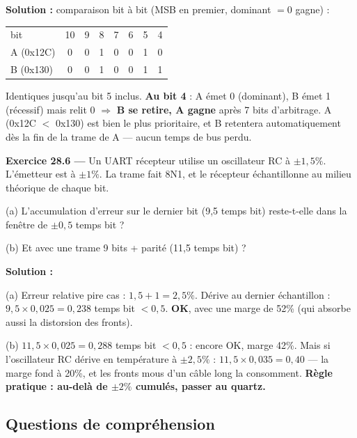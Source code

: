 \documentclass[12pt,a4paper,twoside]{book}
\begin{document}
\begin{pratique}
\textbf{Solution :} comparaison bit à bit (MSB en premier, dominant $= 0$ gagne) :

\begin{center}
\begin{tabular}{lccccccc}
bit & 10 & 9 & 8 & 7 & 6 & 5 & 4 \\
A (0x12C) & 0 & 0 & 1 & 0 & 0 & 1 & 0 \\
B (0x130) & 0 & 0 & 1 & 0 & 0 & 1 & 1 \\
\end{tabular}
\end{center}

Identiques jusqu'au bit 5 inclus. \textbf{Au bit 4} : A émet 0 (dominant), B émet 1 (récessif) mais relit 0 $\Rightarrow$ \textbf{B se retire, A gagne} après 7 bits d'arbitrage. A (0x12C $<$ 0x130) est bien le plus prioritaire, et B retentera automatiquement dès la fin de la trame de A --- aucun temps de bus perdu.
\end{pratique}

\textbf{Exercice 28.6 ---} Un UART récepteur utilise un oscillateur RC à $\pm 1{,}5\%$. L'émetteur est à $\pm 1\%$. La trame fait 8N1, et le récepteur échantillonne au milieu théorique de chaque bit.

(a) L'accumulation d'erreur sur le dernier bit (9,5 temps bit) reste-t-elle dans la fenêtre de $\pm 0{,}5$ temps bit ?

(b) Et avec une trame 9 bits + parité (11,5 temps bit) ?

\begin{pratique}
\textbf{Solution :}

(a) Erreur relative pire cas : $1{,}5 + 1 = 2{,}5\%$. Dérive au dernier échantillon : $9{,}5 \times 0{,}025 = 0{,}238$ temps bit $< 0{,}5$. \textbf{OK}, avec une marge de 52\% (qui absorbe aussi la distorsion des fronts).

(b) $11{,}5 \times 0{,}025 = 0{,}288$ temps bit $< 0{,}5$ : encore OK, marge 42\%. Mais si l'oscillateur RC dérive en température à $\pm 2{,}5\%$ : $11{,}5\times0{,}035 = 0{,}40$ --- la marge fond à 20\%, et les fronts mous d'un câble long la consomment. \textbf{Règle pratique : au-delà de $\pm 2\%$ cumulés, passer au quartz.}
\end{pratique}

\subsection*{Questions de compréhension}
\end{document}
